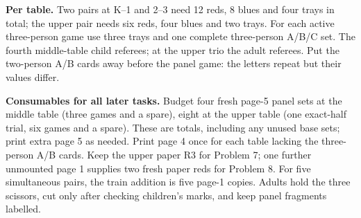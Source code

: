 \documentclass[11pt]{article}
\begin{document}
\textbf{Per table.} Two pairs at K--1 and 2--3 need 12 reds, 8 blues and four trays in total; the upper pair needs six reds, four blues and two trays. For each active three-person game use three trays and one complete three-person A/B/C set. The fourth middle-table child referees; at the upper trio the adult referees. Put the two-person A/B cards away before the panel game: the letters repeat but their values differ.

\textbf{Consumables for all later tasks.} Budget four fresh page-5 panel sets at the middle table (three games and a spare), eight at the upper table (one exact-half trial, six games and a spare). These are totals, including any unused base sets; print extra page 5 as needed. Print page 4 once for each table lacking the three-person A/B cards. Keep the upper paper R3 for Problem 7; one further unmounted page 1 supplies two fresh paper reds for Problem 8. For five simultaneous pairs, the train addition is five page-1 copies. Adults hold the three scissors, cut only after checking children's marks, and keep panel fragments labelled.
\end{document}
